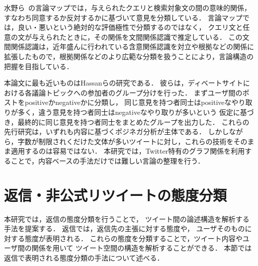 \documentclass[japanese]{jnlp_1.4}
\newcommand{\addspan}[1]{}
\begin{document}
水野ら~\cite{水野_2011}の言論マップでは，与えられたクエリと検索対象文の間の意味的関係，
すなわち同意するか反対するかに基づいて意見を分類している．
言論マップでは，良い・悪いという絶対的な評価極性で分類するのではなく，
クエリ文と任意の文が与えられたときに，その関係を文間関係認識で推定している．
この文間関係認識は，近年盛んに行われている含意関係認識\cite{Dagan_2005}を対立や根拠などの関係に拡張したもので，根拠関係などのより広範な分類を扱うことにより，言論構造の把握を目指している．

本論文に最も近いものはHassanらの研究\cite{Hassan_2012}である．
彼らは，ディベートサイトにおける各議論トピックへの参加者のグループ分けを行った．
まずユーザ間のポストをpositiveかnegativeかに分類し，
同じ意見を持つ者同士はpositiveなやり取りが多く，違う意見を持つ者同士はnegativeなやり取りが多いという
仮定に基づき，最終的に同じ意見を持つ者同士をまとめたグループを出力した．
これらの先行研究は，いずれも内容に基づくポジネガ分析が主体である．
しかしながら，字数が制限されくだけた文体が多いツイートに対し，これらの技術をそのまま適用するのは容易ではない．
本研究では，Twitter特有のグラフ関係を利用することで，内容ベースの手法だけでは難しい言論の整理を行う．


\section{返信・非公式リツイートの態度分類}

本研究では，返信の態度分類を行うことで，
ツイート間の論述構造を解析する手法を提案する．
返信では，返信先の主張に対する態度や，
ユーザそのものに対する態度が表明される．
これらの態度を分類することで，ツイート内容やユーザ間の関係を用いて
ツイート空間の構造を解析することができる．
本節では返信で表明される態度分類の手法について述べる．

\addspan{
\subsection{本稿における各投稿形式の区分}

本稿における表記の使い分けを明確にするため，Twitterにおけるいくつかの投稿形式を整理する．
\begin{description}
 \item[返信] @で始まる投稿であり，特定のツイートに対する返信として投稿すること．Twitterの提供する機能であり，関係が記録されている． 
 \item[公式リツイート] ある投稿をそのままの形でフォロワーに拡散すること．Twitterの提供する機能である．
 \item[非公式リツイート] ある投稿を必要に応じて編集しつつ，自身のコメントを付加して投稿すること．
 「（自分の投稿）[RQ]T @（返信元のアカウント名）（返信元の投稿）」のような形式を取る．
 Twitterの提供する機能ではないが，使用者が多い．
 なお，自身のコメントを付加していないものについても非公式リツイートとして扱う．
\end{description}
本稿では，「返信」という表記は，特に断りのない限り「返信」と「非公式リツイート」の二つをまとめたものを表す．
分けて扱う必要がある場合においては，前者を「返信」，後者を「引用」と表記する．
また，単に「リツイート」「RT」と表記した場合は「公式リツイート」を指すものとする．
}
\end{document}
